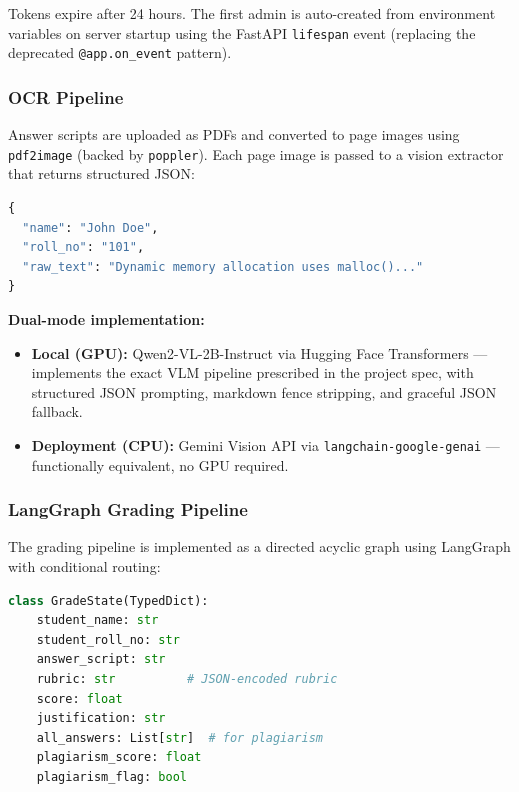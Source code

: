 \documentclass[12pt,a4paper]{article}
\begin{document}
Tokens expire after 24 hours. The first admin is auto-created from environment variables on server startup using the FastAPI \texttt{lifespan} event (replacing the deprecated \texttt{@app.on\_event} pattern).

\subsubsection{OCR Pipeline}

Answer scripts are uploaded as PDFs and converted to page images using \texttt{pdf2image} (backed by \texttt{poppler}). Each page image is passed to a vision extractor that returns structured JSON:

\begin{lstlisting}[language=Python, caption={Vision Extractor return format}]
{
  "name": "John Doe",
  "roll_no": "101",
  "raw_text": "Dynamic memory allocation uses malloc()..."
}
\end{lstlisting}

\textbf{Dual-mode implementation:}
\begin{itemize}[noitemsep]
  \item \textbf{Local (GPU):} Qwen2-VL-2B-Instruct via Hugging Face Transformers — implements the exact VLM pipeline prescribed in the project spec, with structured JSON prompting, markdown fence stripping, and graceful JSON fallback.
  \item \textbf{Deployment (CPU):} Gemini Vision API via \texttt{langchain-google-genai} — functionally equivalent, no GPU required.
\end{itemize}

\subsubsection{LangGraph Grading Pipeline}

The grading pipeline is implemented as a directed acyclic graph using LangGraph with conditional routing:

\begin{lstlisting}[language=Python, caption={GradeState TypedDict structure}]
class GradeState(TypedDict):
    student_name: str
    student_roll_no: str
    answer_script: str
    rubric: str          # JSON-encoded rubric
    score: float
    justification: str
    all_answers: List[str]  # for plagiarism
    plagiarism_score: float
    plagiarism_flag: bool
\end{lstlisting}
\end{document}
